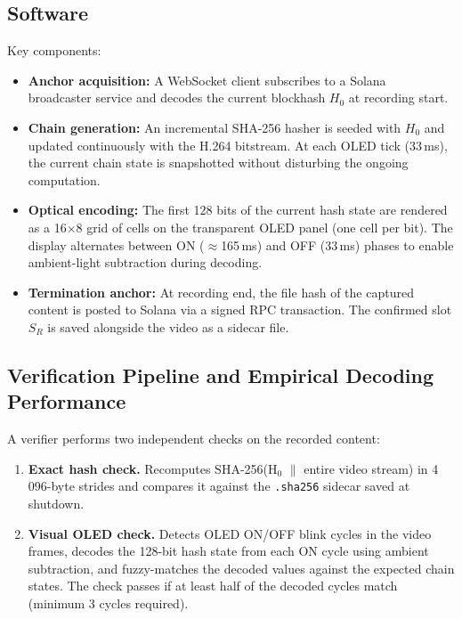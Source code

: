 \documentclass[11pt]{article}
\begin{document}
\subsection{Software}

Key components:

\begin{itemize}
  \item \textbf{Anchor acquisition:} A WebSocket client subscribes to a Solana~\cite{solana}
    broadcaster service and decodes the current blockhash $H_0$ at recording start.

  \item \textbf{Chain generation:} An incremental SHA-256 hasher is seeded with $H_0$
    and updated continuously with the H.264 bitstream. At each OLED tick (33\,ms),
    the current chain state is snapshotted without disturbing the ongoing computation.

  \item \textbf{Optical encoding:} The first 128 bits of the current hash state are
    rendered as a 16$\times$8 grid of cells on the transparent OLED panel
    (one cell per bit). The display alternates between ON ($\approx$165\,ms) and OFF
    (33\,ms) phases to enable ambient-light subtraction during decoding.

  \item \textbf{Termination anchor:} At recording end, the file hash of the captured
    content is posted to Solana via a signed RPC transaction. The confirmed slot $S_R$
    is saved alongside the video as a sidecar file.
\end{itemize}

\subsection{Verification Pipeline and Empirical Decoding Performance}
\label{sec:impl-status}

A verifier performs two independent checks on the recorded content:

\begin{enumerate}
  \item \textbf{Exact hash check.} Recomputes SHA-256(H$_0$ $\|$ entire video stream)
    in 4\,096-byte strides and compares it against the \texttt{.sha256} sidecar saved
    at shutdown.

  \item \textbf{Visual OLED check.} Detects OLED ON/OFF blink cycles in the video
    frames, decodes the 128-bit hash state from each ON cycle using ambient
    subtraction, and fuzzy-matches the decoded values against the expected chain
    states. The check passes if at least half of the decoded cycles match
    (minimum 3 cycles required).
\end{enumerate}
\end{document}

